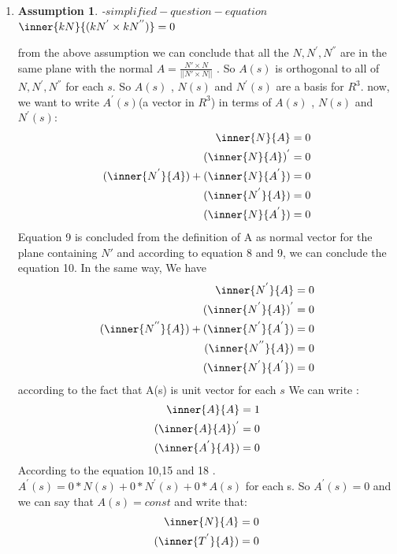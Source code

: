 \documentclass[
	12pt, %
]{fphw}
\theoremstyle{plain}
\newtheorem{assumption}{Assumption}
\begin{document}
\begin{enumerate}
     \item 
     \begin{assumption}-$simplified-question-equation$\label{as:1}
          $\inner{kN}{(kN^{'} \times kN^{''})} = 0$
     \end{assumption}
     from the above assumption we can conclude that all the $N,N^{'},N^{''}$ are in the same plane with the normal $A = \frac{N' \times N}{||N'\times N||}$
     . So $A(s)$ is orthogonal to all of $N,N^{'},N^{''}$ for each $s$. So $A(s)$ , $N(s)$ and $N^{'}(s)$ are a basis for $R^{3}$. now, we want to write $A^{'}(s)$(a vector in $R^{3}$) in terms of $A(s)$ , $N(s)$ and $N^{'}(s)$:
     \begin{align}
         \inner{{N}}{A} & = 0 \\
         (\inner{N}{A})^{'} & = 0 \\
         (\inner{N^{'}}{A})+(\inner{N}{A^{'}}) & = 0 \\
         (\inner{N^{'}}{A}) & = 0 \\
         (\inner{N}{A^{'}}) & = 0
     \end{align}
     Equation 9 is concluded from the definition of A as normal vector for the plane containing $N'$ and according to equation 8 and 9, we can conclude the equation 10. In the same way, We have 
     \begin{align}
          \inner{{N^{'}}}{A} & = 0 \\
          (\inner{N^{'}}{A})^{'} & = 0 \\
          (\inner{N^{''}}{A})+(\inner{N^{'}}{A^{'}}) & = 0 \\
          (\inner{N^{''}}{A}) & = 0 \\
          (\inner{N^{'}}{A^{'}}) & = 0
      \end{align}
      according to the fact that A(s) is unit vector for each $s$ We can write :
      \begin{align}
          \inner{A}{A} & = 1\\
          (\inner{A}{A})^{'} & = 0 \\
          (\inner{A^{'}}{A}) & = 0  
      \end{align}
      According to the equation 10,15 and 18 . $A^{'}(s) = 0*N(s)+0*N^{'}(s)+0*A(s)$ for each s. So $A^{'}(s)=0$ and we can say that $A(s)=const$ and write that:
      \begin{align}
          \inner{N}{A} & = 0\\
          (\inner{T^{'}}{A}) & = 0 \\

\end{align}
\end{enumerate}
\end{document}
